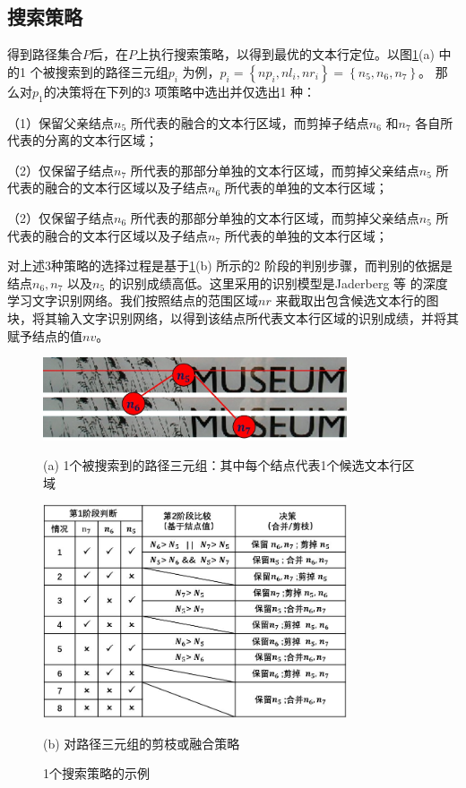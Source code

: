         \subsection{搜索策略}
        \label{sec.c4_searching strategies}

        得到路径集合$P$后，在$P$上执行搜索策略，以得到最优的文本行定位。以图\ref{fig.c4_search_strategy}(a) 中的1 个被搜索到的路径三元组$p_i$ 为例，$p_i=\left\{np_i,nl_i,nr_i\right\}=\left\{n_5,n_6,n_7\right\}$。 那么对$p_1$的决策将在下列的3 项策略中选出并仅选出1 种：

        （1）保留父亲结点$n_5$ 所代表的融合的文本行区域，而剪掉子结点$n_6$ 和$n_7$ 各自所代表的分离的文本行区域；

        （2）仅保留子结点$n_7$ 所代表的那部分单独的文本行区域，而剪掉父亲结点$n_5$ 所代表的融合的文本行区域以及子结点$n_6$ 所代表的单独的文本行区域；

        （2）仅保留子结点$n_6$ 所代表的那部分单独的文本行区域，而剪掉父亲结点$n_5$ 所代表的融合的文本行区域以及子结点$n_7$ 所代表的单独的文本行区域；

        对上述3种策略的选择过程是基于\ref{fig.c4_search_strategy}(b) 所示的2 阶段的判别步骤，而判别的依据是结点$n_6,n_7$ 以及$n_5$ 的识别成绩高低。这里采用的识别模型是Jaderberg 等\cite{Jaderberg2016Reading} 的深度学习文字识别网络。我们按照结点的范围区域$nr$ 来截取出包含候选文本行的图块，将其输入文字识别网络，以得到该结点所代表文本行区域的识别成绩，并将其赋予结点的值$nv$。

        \begin{figure}[!h]
        \centering
        \includegraphics[width=0.8\textwidth]{./figures/c4_search_strategy1.jpg}
        \centerline{\small (a) 1个被搜索到的路径三元组：其中每个结点代表1个候选文本行区域 }
        \includegraphics[width=0.8\textwidth]{./figures/c4_search_strategy2.jpg}
        \centerline{\small (b) 对路径三元组的剪枝或融合策略}
        \caption{ 1个搜索策略的示例}
        \label{fig.c4_search_strategy}
        \end{figure}

